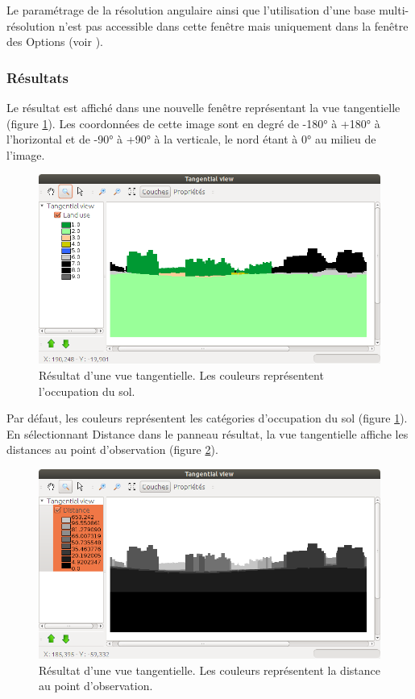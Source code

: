 \documentclass{report}
\begin{document}
Le paramétrage de la résolution angulaire ainsi que l'utilisation d'une base multi-résolution n'est pas accessible dans cette fenêtre mais uniquement dans la fenêtre des Options (voir ).

\subsubsection{Résultats}
\label{viewtan_result}
Le résultat est affiché dans une nouvelle fenêtre représentant la vue tangentielle (figure \ref{viewtan_land}). Les coordonnées de cette image sont en degré de -180° à +180° à l'horizontal et de -90° à +90° à la verticale, le nord étant à 0° au milieu de l'image. 

\begin{figure}[H]
	\includegraphics[scale=0.5]{img/viewtan_land-fr.png} 
	\caption{Résultat d'une vue tangentielle. Les couleurs représentent l'occupation du sol.}
	\label{viewtan_land}
\end{figure}

Par défaut, les couleurs représentent les catégories d'occupation du sol (figure \ref{viewtan_land}). En sélectionnant Distance dans le panneau résultat, la vue tangentielle affiche les distances au point d'observation (figure \ref{viewtan_dist}).

\begin{figure}[H]
	\includegraphics[scale=0.5]{img/viewtan_dist-fr.png} 
	\caption{Résultat d'une vue tangentielle. Les couleurs représentent la distance au point d'observation.}
	\label{viewtan_dist}
\end{figure}
\end{document}
